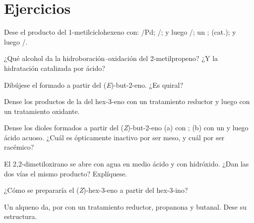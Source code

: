 \section{Ejercicios}

\begin{exercise}[$\star$]\label{exo:b2:alkene-redox:1}
Dese el producto del 1-metilciclohexeno con: /Pd; /;
 y luego /; un ;  (cat.);  y luego
/.
\end{exercise}

\begin{exercise}[$\star$]\label{exo:b2:alkene-redox:2}
¿Qué alcohol da la hidroboración--oxidación del 2-metilpropeno? ¿Y la hidratación catalizada
por ácido?
\end{exercise}

\begin{exercise}[$\star$]\label{exo:b2:alkene-redox:3}
Dibújese el  formado a partir del (\textit{E})-but-2-eno. ¿Es quiral?
\end{exercise}

\begin{exercise}[$\star$]\label{exo:b2:alkene-redox:4}
Dense los productos de la  del hex-3-eno con un tratamiento reductor y luego con un
tratamiento oxidante.
\end{exercise}

\begin{exercise}[$\star\star$]\label{exo:b2:alkene-redox:5}
Dense los dioles formados a partir del (\textit{Z})-but-2-eno (a) con ; (b) con un 
y luego ácido acuoso. ¿Cuál es ópticamente inactivo por ser meso, y cuál
por ser racémico?
\end{exercise}

\begin{exercise}[$\star\star$]\label{exo:b2:alkene-redox:6}
El 2,2-dimetiloxirano se abre con agua en medio ácido y con hidróxido. ¿Dan las dos vías el
mismo producto? Explíquese.
\end{exercise}

\begin{exercise}[$\star\star$]\label{exo:b2:alkene-redox:7}
¿Cómo se prepararía el (\textit{Z})-hex-3-eno a partir del hex-3-ino?
\end{exercise}

\begin{exercise}[$\star\star$]\label{exo:b2:alkene-redox:8}
Un alqueno  da, por  con un tratamiento reductor, propanona y butanal.
Dese su estructura.
\end{exercise}

